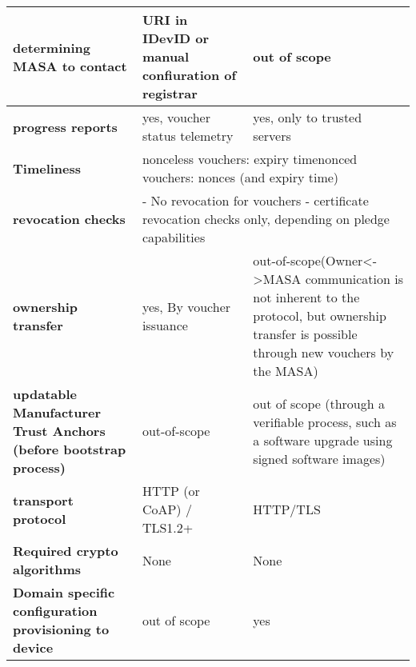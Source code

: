 \begin{landscape}
\begin{longtable}[!htbp]{|p{4cm}|l|l|}
		\hline
		\rowcolor[rgb]{ .745,  .804,  .843} \textbf{determining MASA to contact} & \multicolumn{1}{p{18.335em}|}{\cellcolor[rgb]{ 1,  1,  1}URI in IDevID or manual confiuration of registrar} & \cellcolor[rgb]{ 1,  1,  1}out of scope \bigstrut\\
		\hline
		\rowcolor[rgb]{ .745,  .804,  .843} \textbf{progress reports} & \cellcolor[rgb]{ 1,  1,  1}yes, voucher status telemetry & \cellcolor[rgb]{ 1,  1,  1}yes, only to trusted servers \bigstrut\\
		\hline
		\rowcolor[rgb]{ .745,  .804,  .843} \textbf{Timeliness} & \multicolumn{2}{p{36.67em}|}{\cellcolor[rgb]{ 1,  1,  1}nonceless vouchers: expiry time\newline{}nonced vouchers: nonces (and expiry time)} \bigstrut\\
		\hline
		\rowcolor[rgb]{ .745,  .804,  .843} \textbf{revocation checks} & \multicolumn{2}{p{36.67em}|}{\cellcolor[rgb]{ 1,  1,  1} - No revocation for vouchers\newline{}  - certificate revocation checks only, depending on pledge capabilities} \bigstrut\\
		\hline
		\rowcolor[rgb]{ .745,  .804,  .843} \textbf{ownership transfer} & \cellcolor[rgb]{ 1,  1,  1}yes, By voucher issuance & \multicolumn{1}{p{18.335em}|}{\cellcolor[rgb]{ 1,  1,  1}out-of-scope\newline{}(Owner<->MASA communication is not inherent to the protocol, but ownership transfer is possible through new vouchers by the MASA)} \bigstrut\\
		\hline
		\rowcolor[rgb]{ .745,  .804,  .843} \textbf{updatable Manufacturer Trust Anchors (before bootstrap process)} & \cellcolor[rgb]{ 1,  1,  1}out-of-scope & \multicolumn{1}{p{18.335em}|}{\cellcolor[rgb]{ 1,  1,  1}out of scope \newline{}(through a verifiable process, such as a software upgrade using signed\newline{}   software images)} \bigstrut\\
		\hline
		\rowcolor[rgb]{ .745,  .804,  .843} \textbf{transport protocol} & \cellcolor[rgb]{ 1,  1,  1}HTTP (or CoAP) / TLS1.2+ & \cellcolor[rgb]{ 1,  1,  1}HTTP/TLS \bigstrut\\
		\hline
		\rowcolor[rgb]{ .745,  .804,  .843} \textbf{Required crypto algorithms } & \multicolumn{1}{p{18.335em}|}{\cellcolor[rgb]{ 1,  1,  1}None} & \multicolumn{1}{p{18.335em}|}{\cellcolor[rgb]{ 1,  1,  1}None} \bigstrut\\
		\hline
		\rowcolor[rgb]{ .745,  .804,  .843} \textbf{Domain specific configuration provisioning to device} & \cellcolor[rgb]{ 1,  1,  1}out of scope & \cellcolor[rgb]{ 1,  1,  1}yes \bigstrut\\
		\hline

\end{longtable}
\end{landscape}